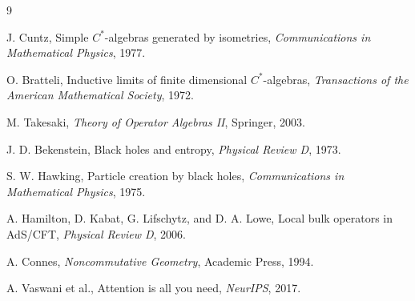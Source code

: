 \documentclass[11pt,a4paper]{article}
\begin{document}
\begin{thebibliography}{9}

J. Cuntz, Simple $C^*$-algebras generated by isometries, \emph{Communications in Mathematical Physics}, 1977.

O. Bratteli, Inductive limits of finite dimensional $C^*$-algebras, \emph{Transactions of the American Mathematical Society}, 1972.

M. Takesaki, \emph{Theory of Operator Algebras II}, Springer, 2003.

J. D. Bekenstein, Black holes and entropy, \emph{Physical Review D}, 1973.

S. W. Hawking, Particle creation by black holes, \emph{Communications in Mathematical Physics}, 1975.

A. Hamilton, D. Kabat, G. Lifschytz, and D. A. Lowe, Local bulk operators in AdS/CFT, \emph{Physical Review D}, 2006.

A. Connes, \emph{Noncommutative Geometry}, Academic Press, 1994.

A. Vaswani et al., Attention is all you need, \emph{NeurIPS}, 2017.

\end{thebibliography}
\end{document}
